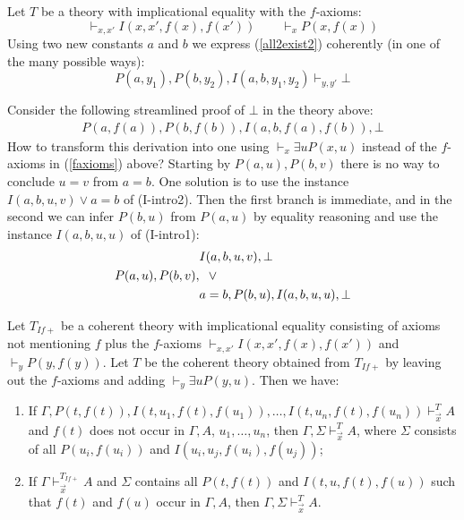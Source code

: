 \documentclass[10pt,a4paper]{article}
\begin{document}
\begin{example}\label{exa:counter2CL}
Let $T$  be a theory with implicational equality with the $f$-axioms:
\begin{equation}\label{faxioms}
\vdash_{x,x'} I(x,x',f(x),f(x') )\quad\quad \vdash_{x} P(x,f(x))
\end{equation}
Using two new constants $a$ and $b$ we express (\ref{all2exist2}) coherently
(in one of the many possible ways):
\[
P(a,y_1),P(b,y_2),I(a,b,y_1,y_2)  \vdash_{y,y'} \bot
\]

Consider the following streamlined proof of $\bot$ in the theory above:
\begin{align*}
P(a,f(a)), P(b,f(b)),I(a,b,f(a),f(b)),\bot
\end{align*}
How to transform this derivation into one using 
$\vdash_{x} \exists u P(x,u)$ instead of the $f$-axioms 
in (\ref{faxioms}) above? Starting by $P(a,u), P(b,v)$
there is no way to conclude $u=v$ from $a=b$.
One solution is to use the instance $I(a,b,u,v) \lor a=b$ of (I-intro2).
Then the first branch is immediate, and in the second
we can infer $P(b,u)$ from $P(a,u)$ by equality reasoning and use 
the instance $I(a,b,u,u)$ of (I-intro1):
\begin{align*}
&I(a,b,u,v),\bot\\
P(a,u),P(b,v),&{\hphantom w}\lor\\
& a=b,P(b,u),I(a,b,u,u),\bot\\
\end{align*}
\end{example}




\begin{lemma}\label{lem:main}
Let $T_{I\!f{+}}$ be a coherent theory with implicational equality consisting of
axioms not mentioning $f$ plus the $f$-axioms $\vdash_{x,x'} I(x,x',f(x),f(x'))$
and $\vdash_{{y}} P({y},f({y}))$. Let $T$ be the coherent theory obtained from 
$T_{I\!f{+}}$ by leaving out the $f$-axioms and adding $\vdash_{{y}} \exists u P({y},u)$.
Then we have:
\begin{enumerate}
\item If $\Gamma,P(t,f(t)), I(t,u_1,f(t),f(u_1)),\ldots,I(t,u_n,f(t),f(u_n))\vdash_{\vec{x}}^{T} A$
and $f(t)$ does not occur in $\Gamma,A$, $u_1,\ldots,u_n$, then  
$\Gamma,\Sigma\vdash_{\vec{x}}^{T} A$, where $\Sigma$ consists of 
all $P(u_i,f(u_i))$ and $I(u_i,u_j,f(u_i),f(u_j))$;
\item If $\Gamma\vdash_{\vec{x}}^{T_{I\!f{+}}} A$ and $\Sigma$ contains all $P(t,f(t))$ and
$I(t,u,f(t),f(u))$ such that $f(t)$ and $f(u)$ occur in $\Gamma,A$,
then $\Gamma,\Sigma\vdash_{\vec{x}}^{T} A$.
\end{enumerate}
\end{lemma}
\end{document}
